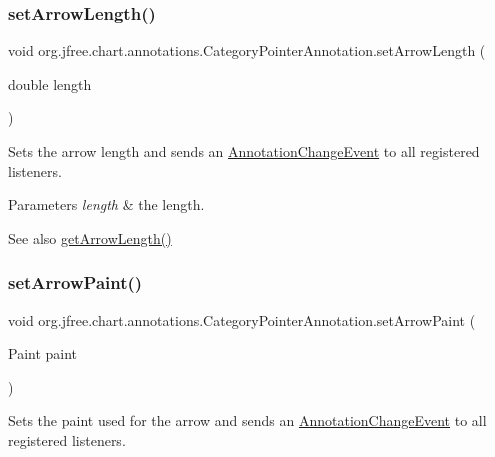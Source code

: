 \subsubsection{\texorpdfstring{set\+Arrow\+Length()}{setArrowLength()}}
{\footnotesize\ttfamily void org.\+jfree.\+chart.\+annotations.\+Category\+Pointer\+Annotation.\+set\+Arrow\+Length (\begin{DoxyParamCaption}\item[{double}]{length }\end{DoxyParamCaption})}

Sets the arrow length and sends an \mbox{\hyperlink{}{Annotation\+Change\+Event}} to all registered listeners.


\begin{DoxyParams}{Parameters}
{\em length} & the length.\\
\hline
\end{DoxyParams}
\begin{DoxySeeAlso}{See also}
\mbox{\hyperlink{classorg_1_1jfree_1_1chart_1_1annotations_1_1_category_pointer_annotation_a6e00ae383d6da634eee3cfacdd18b9b2}{get\+Arrow\+Length()}} 
\end{DoxySeeAlso}
\mbox{\label{classorg_1_1jfree_1_1chart_1_1annotations_1_1_category_pointer_annotation_ab9c3c0cd2a1057181ae49aa8acb650ed}} 
\subsubsection{\texorpdfstring{set\+Arrow\+Paint()}{setArrowPaint()}}
{\footnotesize\ttfamily void org.\+jfree.\+chart.\+annotations.\+Category\+Pointer\+Annotation.\+set\+Arrow\+Paint (\begin{DoxyParamCaption}\item[{Paint}]{paint }\end{DoxyParamCaption})}

Sets the paint used for the arrow and sends an \mbox{\hyperlink{}{Annotation\+Change\+Event}} to all registered listeners.


